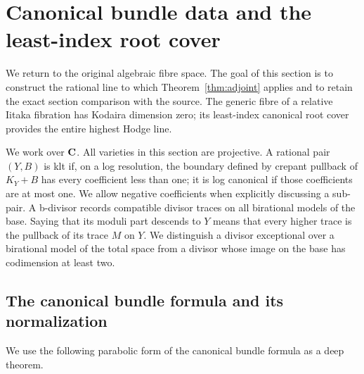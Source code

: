 \section{Canonical bundle data and the least-index root cover}\label{sec:canonical}
\label{altord:sec:canonical}

We return to the original algebraic fibre space. The goal of this
section is to construct the rational line to which
Theorem~\ref{thm:adjoint} applies and to retain the exact section
comparison with the source. The generic fibre of a relative Iitaka
fibration has Kodaira dimension zero; its least-index canonical
root cover provides the entire highest Hodge line.

We work over \(\mathbf C\). All varieties in this section are projective.
A rational pair $(Y,B)$ is klt if, on a log resolution, the boundary
defined by crepant pullback of $K_Y+B$ has every coefficient less
than one; it is log canonical if those coefficients are at most
one. We allow negative coefficients when explicitly discussing a
sub-pair. A b-divisor records compatible divisor traces on all
birational models of the base. Saying that its moduli part descends
to $Y$ means that every higher trace is the pullback of its trace $M$
on $Y$.
We distinguish a divisor exceptional over a birational model of the
total space from a divisor whose image on the base has codimension at
least two.

\subsection{The canonical bundle formula and its normalization}

We use the following parabolic form of the canonical bundle formula as
a deep theorem.

